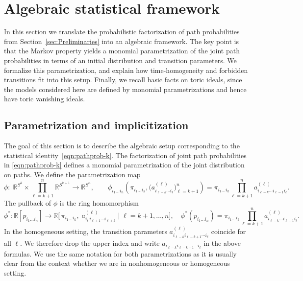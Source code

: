 \documentclass[11pt, a4paper]{article}
\numberwithin{equation}{section}
\theoremstyle{plain}
\theoremstyle{definition}
\begin{document}
 \section{Algebraic statistical framework}\label{sec:algebraic_description}
In this section we translate the probabilistic factorization of path probabilities from
Section~\ref{sec:Preliminaries} into an algebraic  framework. The key point is that the
Markov property yields a monomial parametrization of the joint path probabilities in terms of an
initial distribution and transition parameters. We formalize this parametrization, and explain how time-homogeneity and forbidden transitions fit into this
setup. Finally, we recall basic facts on toric ideals, since the models considered here are defined
by monomial parametrizations and hence have toric vanishing ideals.

 \subsection{Parametrization and implicitization}
\label{subsec:paramtrization}

The goal of this section is to describe the algebraic setup corresponding to the statistical identity~\eqref{eqn:pathprob-k}. The factorization of joint path probabilities in \eqref{eqn:pathprob-k} defines a monomial parametrization of the joint distribution on paths.
We define the parametrization map
\[
\phi:\;
\mathbb{R}^{S^k} \times \prod_{\ell=k+1}^n \mathbb{R}^{S^{k+1}}
\longrightarrow \mathbb{R}^{S^n},
\qquad
\phi_{i_1\ldots i_n}\!\left(
\pi_{i_1\ldots i_k},
\bigl(a^{(\ell)}_{i_{\ell-k}\cdots i_{\ell}}\bigr)_{\ell=k+1}^n
\right)
=
\pi_{i_1\ldots i_k}
\prod_{\ell=k+1}^n a^{(\ell)}_{i_{\ell-k}\cdots i_{\ell-1} i_\ell}.
\]
The pullback of $\phi$ is the ring homomorphism
\[
\phi^*: \mathbb{R}[p_{i_1\ldots i_n}] \rightarrow \mathbb{R}\bigl[\,
\pi_{i_1 \ldots i_k},\;
a^{(\ell)}_{i_{\ell}\, i_{\ell+1}\cdots i_{\ell+k}}
\;\big|\;
\ell=k+1,\ldots,n
\bigr], \quad \phi^*(p_{i_1 \ldots i_n})= \pi_{i_1 \ldots i_k}\prod_{\ell=k+1}^n a^{(\ell)}_{i_{\ell-k}\cdots i_{\ell-1} i_{\ell}}.
\]
In the homogeneous setting, the transition parameters
$a^{(\ell)}_{i_{\ell-k} i_{\ell-k+1} \cdots i_{\ell}}$
coincide for all $\ell$. We therefore drop the upper index and write
$a_{i_{\ell-k} i_{\ell-k+1} \cdots i_{\ell}}$ in the above formulas. We use the same notation for both parametrizations as it is usually clear from the context whether we are in nonhomogeneous or homogeneous setting.
\end{document}
